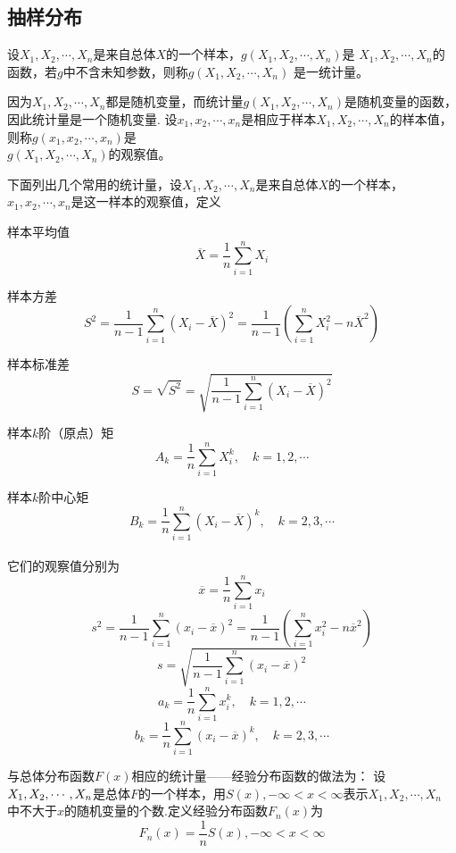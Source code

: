 \subsection{抽样分布}
\begin{definition}
    \begin{definition}
        设$X_1,X_2,\cdots,X_n$是来自总体$X$的一个样本，$g(X_1,X_2,\cdots,X_n)$是
        $X_1,X_2,\cdots,X_n$的函数，若$g$中不含未知参数，则称$g(X_1,X_2,\cdots,X_n)$
        是一{\heiti 统计量}。

        因为$X_1,X_2,\cdots,X_n$都是随机变量，而统计量$g(X_1,X_2,\cdots,X_n)$是随机变量的函数，因此统计量是一个随机变量.
        设$x_1,x_2,\cdots,x_n$是相应于样本$X_1,X_2,\cdots,X_n$的样本值，
        则称$g(x_1,x_2,\cdots,x_n)$是\\$g(X_1,X_2,\cdots,X_n)$的观察值。

        下面列出几个常用的统计量，设$X_1,X_2,\cdots,X_n$是来自总体$X$的一个样本，$x_1,x_2,\cdots,x_n$是这一样本的观察值，定义

        {\heiti 样本平均值} $$\overline{X}=\frac{1}{n}\sum_{i=1}^nX_i$$

        {\heiti 样本方差}$$S^2=\frac{1}{n-1}\sum_{i=1}^n{(X_i-\overline{X})}^2=\frac{1}{n-1}(\sum_{i=1}^nX_i^2-n\overline{X}^2)$$

        {\heiti 样本标准差}$$S=\sqrt{S^2}=\sqrt{\frac{1}{n-1}\sum_{i=1}^n{(X_i-\overline{X})}^2}$$

        {\heiti 样本$k$阶（原点）矩}$$A_k=\frac{1}{n}\sum_{i=1}^nX_i^k,\quad k=1,2,\cdots$$

        {\heiti 样本$k$阶中心矩}$$B_k=\frac{1}{n}\sum_{i=1}^n{(X_i-\overline{X})}^k,\quad k=2,3,\cdots$$\\
        它们的观察值分别为
        $$\overline{x}=\frac{1}{n}\sum_{i=1}^nx_i$$
        $$s^2=\frac{1}{n-1}\sum_{i=1}^n{(x_i-\overline{x})}^2=\frac{1}{n-1}(\sum_{i=1}^nx_i^2-n\overline{x}^2)$$
        $$s=\sqrt{\frac{1}{n-1}\sum_{i=1}^n{(x_i-\overline{x})}^2}$$
        $$a_k=\frac{1}{n}\sum_{i=1}^nx_i^k,\quad k=1,2,\cdots$$
        $$b_k=\frac{1}{n}\sum_{i=1}^n{(x_i-\overline{x})}^k,\quad k=2,3,\cdots$$
    \end{definition}
\end{definition}

\begin{definition}[经验分布函数]
    与总体分布函数$F(x)$相应的统计量——经验分布函数的做法为：
    设$X_1,\\X_2,\cdots,X_n$是总体$F$的一个样本，用$S(x),-\infty<x<\infty$表示$X_1,X_2,\cdots,X_n$
    中不大于$x$的随机变量的个数.定义经验分布函数$F_n(x)$为
    $$F_n(x)=\frac{1}{n}S(x),-\infty<x<\infty$$
\end{definition}

